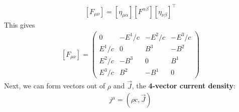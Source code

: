 \documentclass{book}
\theoremstyle{definition}
\begin{document}
\begin{align*}
\boxed{[F_{\mu\nu}] = [\eta_{\mu\alpha}][F^{\alpha\beta}][\eta_{\nu\beta}]^{\top}}
\end{align*}
This gives
\begin{align*}
\boxed{[F_{\mu\nu}] = 
	\begin{pmatrix}
	0 & -E^1/c & -E^2/c & -E^3/c\\
	E^1/c & 0 & B^3 & -B^2\\
	E^2/c & -B^3 & 0 & B^1\\
	E^3/c & B^2 & -B^1 & 0
	\end{pmatrix}}
\end{align*}
Next, we can form vectors out of $\rho$ and $\vec{J}$, the \textbf{4-vector current density}:
\begin{align*}
\boxed{j^\mu = \left( \rho c, \vec{J} \right)}
\end{align*}
\end{document}
